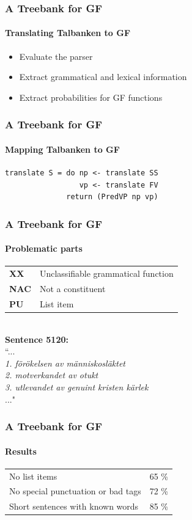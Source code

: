 \documentclass[10pt]{beamer}
\begin{document}
\begin{frame}
\frametitle{A Treebank for GF}
\framesubtitle{Translating Talbanken to GF} 
\begin{itemize}
\item{Evaluate the parser}
\pause
\item{Extract grammatical and lexical information}
\pause
\item{Extract probabilities for GF functions}
\end{itemize}
\end{frame}

\begin{frame}[containsverbatim]
\frametitle{A Treebank for GF}
\framesubtitle{Mapping Talbanken to GF} 
\begin{verbatim}
translate S = do np <- translate SS
                 vp <- translate FV
              return (PredVP np vp)
\end{verbatim}
\end{frame}

\begin{frame}
\frametitle{A Treebank for GF}
\framesubtitle{Problematic parts} 
\begin{tabular}{ll}
\textbf{XX} &Unclassifiable grammatical function\\
\textbf{NAC}&Not a constituent\\
\textbf{PU}&List item\\
\end{tabular}\\
\vspace{5mm}
\textbf{Sentence 5120:}\\
``...\\
\emph{1. förökelsen av människosläktet}\\
\emph{2. motverkandet av otukt}\\
\emph{3. utlevandet av genuint kristen kärlek}\\
..."\\

\end{frame}


\begin{frame}[containsverbatim]
\frametitle{A Treebank for GF}
\framesubtitle{Results} 
\begin{tabular}{ll}
No list items & 65 \%\\
No special punctuation or bad tags& 72 \%\\
Short sentences with known words & 85 \%\\
\end{tabular}
\end{frame}
\end{document}
